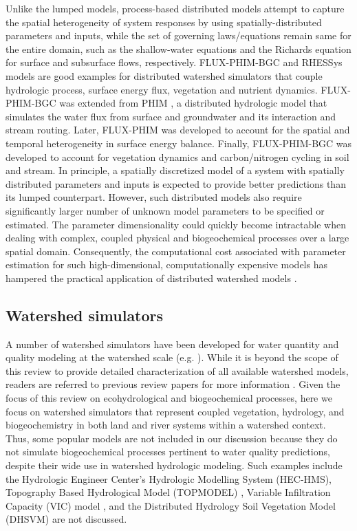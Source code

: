 \documentclass[preprint,review, 12pt]{elsarticle}
\begin{document}
Unlike the lumped models, process-based distributed models attempt to capture the spatial heterogeneity of system responses by using spatially-distributed parameters and inputs, while the set of governing laws/equations remain same for the entire domain, such as the shallow‐water equations \citep{Hirsch1988} and the Richards equation \citep{Richards1931} for surface and subsurface flows, respectively. FLUX-PHIM-BGC\citep{Shi2018} and RHESSys \citep{Tague2004d} models are good examples for distributed watershed simulators that couple hydrologic process, surface energy flux, vegetation and nutrient dynamics. FLUX-PHIM-BGC was extended from PHIM \citep{Qu2004}, a distributed hydrologic model that simulates the water flux from surface and groundwater and its interaction and stream routing. Later, FLUX-PHIM\citep{Shi2013} was developed to account for the spatial and temporal heterogeneity in surface energy balance. Finally, FLUX-PHIM-BGC was developed to account for vegetation dynamics and carbon/nitrogen cycling in soil and stream. In principle, a spatially discretized model of a system with spatially distributed parameters and inputs is expected to provide better predictions than its lumped counterpart. However, such distributed models also require significantly larger number of unknown model parameters to be specified or estimated. The parameter dimensionality could quickly become intractable when dealing with complex, coupled physical and biogeochemical processes over a large spatial domain. Consequently, the computational cost associated with parameter estimation for such high-dimensional, computationally expensive models has hampered the practical application of distributed watershed models \citep{Pokhrel2008}.

\subsection{Watershed simulators}\label{simulators}

A number of watershed simulators have been developed for water quantity and quality modeling at the watershed scale (e.g. \citealp{Daniel2011, Singh2005, Wellen2015, Migliaccio2007, Moriasi2012, Devia2015, Elliot2010, Gao2014}). While it is beyond the scope of this review to provide detailed characterization of all available watershed models, readers are referred to previous review papers for more information \citep{Wellen2015, Fatichi2016}. Given the focus of this review on ecohydrological and biogeochemical processes, here we focus on watershed simulators that represent coupled vegetation, hydrology, and biogeochemistry in both land and river systems within a watershed context. Thus, some popular models are not included in our discussion because they do not simulate biogeochemical processes pertinent to water quality predictions, despite their wide use in watershed hydrologic modeling. Such examples include the Hydrologic Engineer Center’s Hydrologic Modelling System (HEC-HMS), Topography Based Hydrological Model (TOPMODEL) \citep{Beven1997}, Variable Infiltration Capacity (VIC) model \citep{Liang1994,Hamman2018}, and the Distributed Hydrology Soil Vegetation Model (DHSVM) \citep{Wigmosta1994} are not discussed.  
\end{document}
